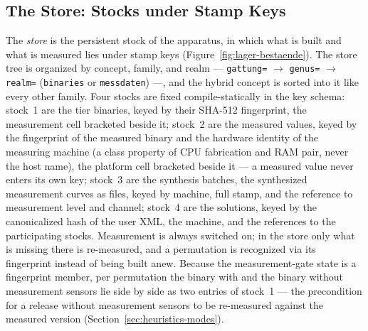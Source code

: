 \begin{nurlang}
\subsection{The Store: Stocks under Stamp Keys}\label{sec:lager}
The \emph{store} is the persistent stock of the apparatus, in which what is built and what is measured lies
under stamp keys (Figure~\ref{fig:lager-bestaende}). The store tree is organized by concept,
family, and realm --- \texttt{gattung=} $\to$ \texttt{genus=} $\to$ \texttt{realm=}
(\texttt{binaries} or \texttt{messdaten}) ---, and the hybrid concept is sorted into it like every other
family. Four stocks are fixed compile-statically in the key schema:
stock~1 are the tier binaries, keyed by their SHA-512 fingerprint, the measurement cell bracketed
beside it; stock~2 are the measured values, keyed by the fingerprint of the measured binary and
the hardware identity of the measuring machine (a class property of CPU fabrication and
RAM pair, never the host name), the platform cell bracketed beside it --- a measured value never enters
its own key; stock~3 are the synthesis batches, the synthesized measurement curves as
files, keyed by machine, full stamp, and the reference to measurement level and channel; stock~4
are the solutions, keyed by the canonicalized hash of the user XML, the machine, and the
references to the participating stocks. Measurement is always switched on; in the store only what is missing there
is re-measured, and a permutation is recognized via its fingerprint instead of being built
anew. Because the measurement-gate state is a fingerprint member, per permutation the binary with and
the binary without measurement sensors lie side by side as two entries of stock~1 --- the precondition for a
release without measurement sensors to be re-measured against the measured version
(Section~\ref{sec:heuristics-modes}).


\end{nurlang}
